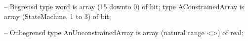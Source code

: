 -- Begrensd
type word is array (15 downto 0) of bit;
type AConstrainedArray is array (StateMachine, 1 to 3) of bit;

-- Onbegrensd
type AnUnconstrainedArray is array (natural range <>) of real;